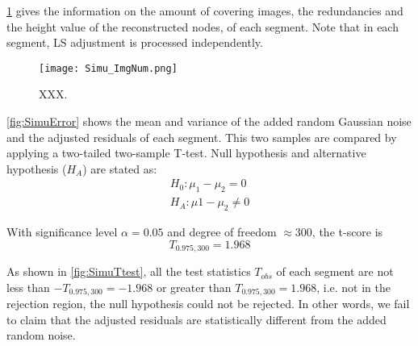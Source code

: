 



\cref{fig:SimuImgNum} gives the information on the amount of covering images, the redundancies and the height value of the reconstructed nodes, of each segment. Note that in each segment, LS adjustment is processed independently.

\begin{figure}
  \centering
  \texttt{[image: Simu\_ImgNum.png]}
  \caption{\small XXX.}
  \label{fig:SimuImgNum}
\end{figure}

\cref{fig:SimuError} shows the mean and variance of the added random Gaussian noise and the adjusted residuals of each segment. This two samples are compared by applying a two-tailed two-sample T-test. Null hypothesis and alternative hypothesis ($H_A$) are stated as:
\begin{equation*}
\begin{split}
H_0: \mu_1-\mu_2=0\\
H_A: \mu1-\mu_2\neq0
\end{split}
\end{equation*}

With significance level $\alpha=0.05$ and degree of freedom $\approx300$, the t-score is 
\begin{equation*}
T_{0.975,300}=1.968
\end{equation*}

As shown in \cref{fig:SimuTtest}, all the test statistics $T_{obs}$ of each segment are not less than $-T_{0.975,300}=-1.968$ or greater than $T_{0.975,300}=1.968$, i.e. not in the rejection region, the null hypothesis could not be rejected. In other words, we fail to claim that the adjusted residuals are statistically different from the added random noise.

